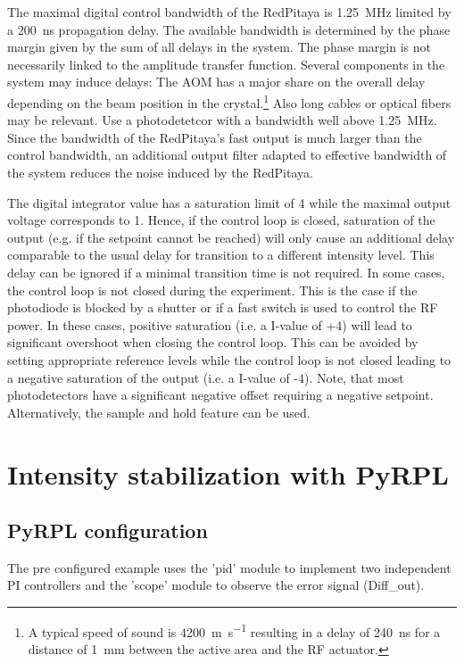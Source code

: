 \documentclass[twoside,a4paper]{refart}
\begin{document}
 
The maximal digital control bandwidth of the RedPitaya is \SI{1.25}{\mega\hertz} limited by a \SI{200}{\nano\second} propagation delay. The available bandwidth is determined by the phase margin given by the sum of all delays in the system. The phase margin is not necessarily linked to the amplitude transfer function. Several components in the system may induce delays: The AOM has a major share on the overall delay depending on the beam position in the crystal.\footnote{A typical speed of sound is \SI{4200}{\meter\per\second} resulting in a delay of \SI{240}{\nano\second} for a distance of \SI{1}{\milli\meter} between the active area and the RF actuator.} Also long cables or optical fibers may be relevant. Use a photodetetcor with a bandwidth well above \SI{1.25}{\mega\hertz}. Since the bandwidth of the RedPitaya's fast output is much larger than the control bandwidth, an additional output filter adapted to effective bandwidth of the system reduces the noise induced by the RedPitaya. 

The digital integrator value has a saturation limit of 4 while the maximal output voltage corresponds to 1. Hence, if the control loop is closed, saturation of the output (e.g. if the setpoint cannot be reached) will only cause an additional delay comparable to the usual delay for transition to a different intensity level. This delay can be ignored if a minimal transition time is not required. In some cases, the control loop is not closed during the experiment. This is the case if the photodiode is blocked by a shutter or if a fast switch is used to control the RF power. In these cases, positive saturation (i.e. a I-value of +4) will lead to significant overshoot when closing the control loop. This can be avoided by setting appropriate reference levels while the control loop is not closed leading to a negative saturation of the output (i.e. a I-value of -4). Note, that most photodetectors have a significant negative offset requiring a negative setpoint. Alternatively, the sample and hold feature can be used.
 

\section{Intensity stabilization with PyRPL}

\subsection{PyRPL configuration}
The pre configured example uses the 'pid' module to implement two independent PI controllers and the 'scope' module to observe the error signal (Diff\_out).
\end{document}
